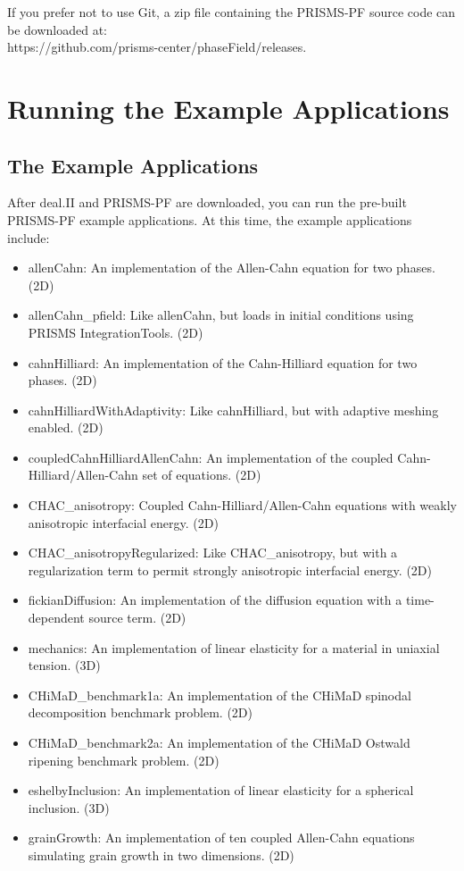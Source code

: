 \documentclass[10pt]{article} %
\begin{document}
If you prefer not to use Git, a zip file containing the PRISMS-PF source code can be downloaded at: \\https://github.com/prisms-center/phaseField/releases.

\section{Running the Example Applications}
\subsection{The Example Applications}
After deal.II and PRISMS-PF are downloaded, you can run the pre-built PRISMS-PF example applications. At this time, the example applications include:
\begin{itemize}
\item allenCahn: An implementation of the Allen-Cahn equation for two phases. (2D)
\item allenCahn\_pfield: Like allenCahn, but loads in initial conditions using PRISMS IntegrationTools. (2D)
\item cahnHilliard: An implementation of the Cahn-Hilliard equation for two phases. (2D)
\item cahnHilliardWithAdaptivity: Like cahnHilliard, but with adaptive meshing enabled. (2D)
\item coupledCahnHilliardAllenCahn: An implementation of the coupled Cahn-Hilliard/Allen-Cahn set of equations. (2D)
\item CHAC\_anisotropy: Coupled Cahn-Hilliard/Allen-Cahn equations with weakly anisotropic interfacial energy. (2D)
\item CHAC\_anisotropyRegularized: Like CHAC\_anisotropy, but with a regularization term to permit strongly anisotropic interfacial energy. (2D)
\item fickianDiffusion: An implementation of the diffusion equation with a time-dependent source term. (2D)
\item mechanics: An implementation of linear elasticity for a material in uniaxial tension. (3D)
\item CHiMaD\_benchmark1a: An implementation of the CHiMaD spinodal decomposition benchmark problem. (2D)
\item CHiMaD\_benchmark2a: An implementation of the CHiMaD Ostwald ripening benchmark problem. (2D)
\item eshelbyInclusion: An implementation of linear elasticity for a spherical inclusion. (3D)
\item grainGrowth: An implementation of ten coupled Allen-Cahn equations simulating grain growth in two dimensions. (2D)

\end{itemize}
\end{document}
